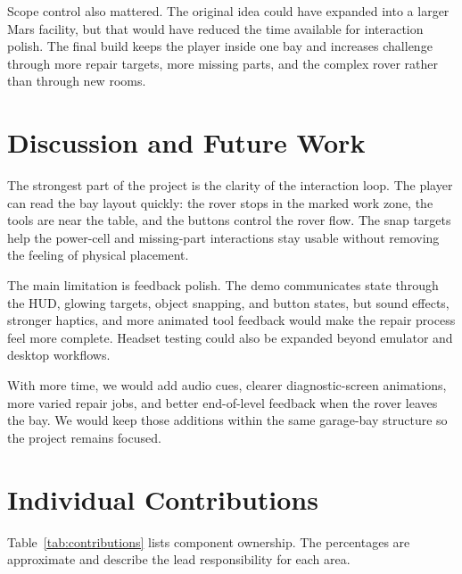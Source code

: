 \documentclass[conference]{IEEEtran}
\begin{document}
Scope control also mattered. The original idea could have expanded into a larger
Mars facility, but that would have reduced the time available for interaction
polish. The final build keeps the player inside one bay and increases challenge
through more repair targets, more missing parts, and the complex rover rather
than through new rooms.

\section{Discussion and Future Work}

The strongest part of the project is the clarity of the interaction loop. The
player can read the bay layout quickly: the rover stops in the marked work zone,
the tools are near the table, and the buttons control the rover flow. The snap
targets help the power-cell and missing-part interactions stay usable without
removing the feeling of physical placement.

The main limitation is feedback polish. The demo communicates state through the
HUD, glowing targets, object snapping, and button states, but sound effects,
stronger haptics, and more animated tool feedback would make the repair process
feel more complete. Headset testing could also be expanded beyond emulator and
desktop workflows.

With more time, we would add audio cues, clearer diagnostic-screen animations,
more varied repair jobs, and better end-of-level feedback when the rover leaves
the bay. We would keep those additions within the same garage-bay structure so
the project remains focused.

\section{Individual Contributions}

Table~\ref{tab:contributions} lists component ownership. The percentages are
approximate and describe the lead responsibility for each area.
\end{document}
